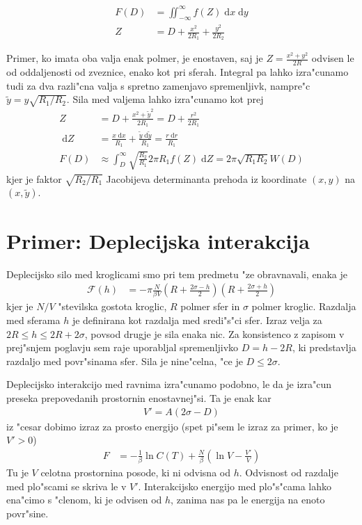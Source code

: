 \documentclass[a4paper,10pt]{article}
\newcommand{\dd}{\;\mathrm{d}}
\begin{document}
\begin{align}
 F(D) &= \iint_{-\infty}^{\infty} f(Z) \dd x \dd y \\
 Z &= D + \frac{x^2}{2R_1} + \frac{y^2}{2R_2}
\end{align}

Primer, ko imata oba valja enak polmer, je enostaven, saj je $Z = \frac{x^2 + y^2}{2R}$ odvisen le od oddaljenosti od zveznice, enako kot pri sferah. 
Integral pa lahko izra"cunamo tudi za dva razli"cna valja s spretno zamenjavo spremenljivk, nampre"c $\tilde y = y\sqrt{R_1/R_2}$. 
Sila med valjema lahko izra"cunamo kot prej
\begin{align}
 Z &= D + \frac{x^2 + \tilde y^2}{2R_1} = D + \frac{r^2}{2R_1} \\
 \dd Z &= \frac{x \dd x}{R_1} + \frac{\tilde y \dd \tilde y}{R_1} = \frac{r \dd r}{R_1} \\
 F(D) &\approx \int_D^{\infty} \sqrt{\frac{R_2}{R_1}} 2\pi R_1 f(Z) \dd Z = 2\pi \sqrt{R_1 R_2} W(D) 
\end{align}
kjer je faktor $\sqrt{R_2/R_1}$ Jacobijeva determinanta prehoda iz koordinate $(x, y)$ na $(x, \tilde y)$. 

\section{Primer: Deplecijska interakcija}

Deplecijsko silo med kroglicami smo pri tem predmetu "ze obravnavali, enaka je
\begin{align}
\label{eq:depl-sila}
 \mathcal F(h) &= -\pi \frac{N}{\beta V} \left(R + \frac{2\sigma-h}{2}\right) \left(R + \frac{2\sigma + h}{2}\right)
\end{align}
kjer je $N/V$ "stevilska gostota kroglic, $R$ polmer sfer in $\sigma$ polmer kroglic. 
Razdalja med sferama $h$ je definirana kot razdalja med sredi"s"ci sfer. 
Izraz velja za $2R \leq h \leq 2R+2\sigma$, povsod drugje je sila enaka nic. 
Za konsistenco z zapisom v prej"snjem poglavju sem raje uporabljal spremenljivko $D = h - 2R$, ki predstavlja razdaljo med povr"sinama sfer. 
Sila je nine"celna, "ce je $D \leq 2\sigma$. 

Deplecijsko interakcijo med ravnima izra"cunamo podobno, le da je izra"cun preseka prepovedanih prostornin enostavnej"si. 
Ta je enak kar
\begin{align}
 V' = A (2\sigma - D)
\end{align}
iz "cesar dobimo izraz za prosto energijo (spet pi"sem le izraz za primer, ko je $V' > 0$)
\begin{align}
 F &= -\frac{1}{\beta} \ln C(T) + \frac{N}{\beta}(\ln V - \frac{V'}{V})
\end{align}
Tu je $V$ celotna prostornina posode, ki ni odvisna od $h$. 
Odvisnost od razdalje med plo"scami se skriva le v $V'$. 
Interakcijsko energijo med plo"s"cama lahko ena"cimo s "clenom, ki je odvisen od $h$, zanima nas pa le energija na enoto povr"sine. 
\end{document}
